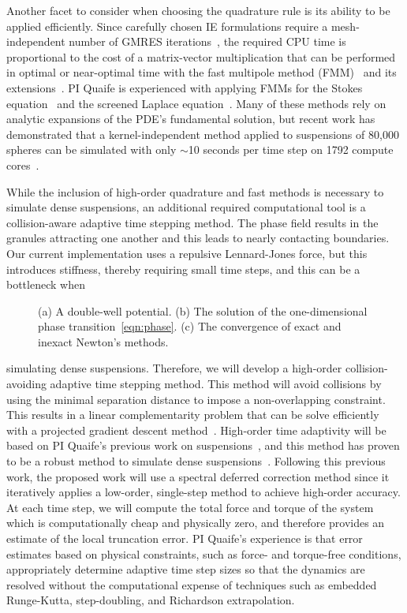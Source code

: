 Another facet to consider when choosing the quadrature rule is its
ability to be applied efficiently. Since carefully chosen IE
formulations require a mesh-independent number of GMRES
iterations~\cite{cam-ips-kel-mey-xue1996}, the required CPU time is
proportional to the cost of a matrix-vector multiplication that can be
performed in optimal or near-optimal time with the fast multipole method
(FMM)~\cite{fmm5} and its extensions~\cite{fmm1, fmm2, fmm3, fmm4, fmm6,
fmm7, ros-ols2016}. PI Quaife is experienced with applying FMMs for the
Stokes equation~\cite{qua-bir2014, bys-sha-qua2020} and the screened
Laplace equation~\cite{kro-qua2011, qua2011}. Many of these methods rely
on analytic expansions of the PDE's fundamental solution, but recent
work has demonstrated that a kernel-independent method applied to
suspensions of 80,000 spheres can be simulated with only $\sim$10
seconds per time step on 1792 compute cores~\cite{Yan2019}.

While the inclusion of high-order quadrature and fast methods is
necessary to simulate dense suspensions, an additional required
computational tool is a collision-aware adaptive time stepping method.
The phase field results in the granules attracting one another and
this leads to nearly contacting boundaries. Our current
implementation uses a repulsive Lennard-Jones force, but this introduces
stiffness, thereby requiring small time steps, and this can be a
bottleneck when 
\begin{figure}
  \vspace{-0pt}
  \centering
   
  \vspace{-10pt}
  \caption{\label{fig:CA} \footnotesize (a) A double-well potential. (b)
  The solution of the one-dimensional phase
  transition~\eqref{eqn:phase}. (c) The convergence of exact and inexact
  Newton's methods.}
\end{figure}
simulating dense suspensions. Therefore, we will develop
a high-order collision-avoiding adaptive time stepping method. This
method will avoid collisions by using the minimal separation
distance to impose a non-overlapping constraint. This results in a
linear complementarity problem that can be solve efficiently with a
projected gradient descent method~\cite{Yan2019}. High-order time
adaptivity will be based on PI Quaife's previous work on
suspensions~\cite{qua-bir2016}, and this method has proven to be a
robust method to simulate dense suspensions~\cite{qua-vee-you2019,
kab-qua-bir2017, qua-gan-you2021}. Following this previous work, the
proposed work will use a spectral deferred correction method since it
iteratively applies a low-order, single-step method to achieve
high-order accuracy. At each time step, we will compute the total force
and torque of the system which is computationally cheap and physically
zero, and therefore provides an estimate of the local truncation error.
PI Quaife's experience is that error estimates based on physical
constraints, such as force- and torque-free conditions, appropriately
determine adaptive time step sizes so that the dynamics are resolved
without the computational expense of techniques such as embedded
Runge-Kutta, step-doubling, and Richardson extrapolation.

